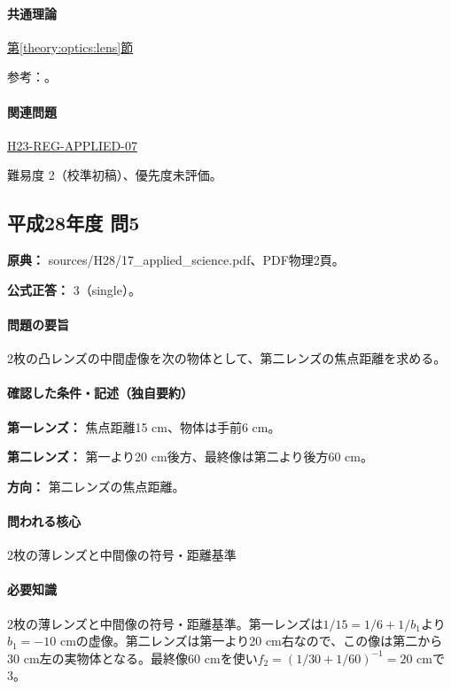 \paragraph{共通理論} \hyperref[theory:optics:lens]{第\ref*{theory:optics:lens}節}

\par 参考：\cite{os_lens}。

\paragraph{関連問題} \hyperref[q:h23-reg-applied-07]{H23-REG-APPLIED-07}

\par 難易度 2（校準初稿）、優先度未評価。

\subsection{平成28年度 問5}
\label{q:h28-reg-applied-05}

\noindent\textbf{原典：} sources/H28/17\_applied\_science.pdf、PDF物理2頁。

\textbf{公式正答：} 3（single）。

\paragraph{問題の要旨} 2枚の凸レンズの中間虚像を次の物体として、第二レンズの焦点距離を求める。

\paragraph{確認した条件・記述（独自要約）}\mbox{}\par

\noindent\textbf{第一レンズ：} 焦点距離15 cm、物体は手前6 cm。\par

\noindent\textbf{第二レンズ：} 第一より20 cm後方、最終像は第二より後方60 cm。\par

\noindent\textbf{方向：} 第二レンズの焦点距離。\par

\paragraph{問われる核心} 2枚の薄レンズと中間像の符号・距離基準

\paragraph{必要知識} 2枚の薄レンズと中間像の符号・距離基準。第一レンズは\(1/15=1/6+1/b_1\)より\(b_1=-10\) cmの虚像。第二レンズは第一より20 cm右なので、この像は第二から30 cm左の実物体となる。最終像60 cmを使い\(f_2=(1/30+1/60)^{-1}=20\) cmで3。

